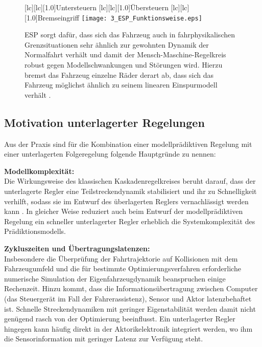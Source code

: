 %
\begin{figure}[h]
	[lc][lc][1.0]{Untersteuern}
	[lc][lc][1.0]{Übersteuern}
	[lc][lc][1.0]{Bremseingriff}
	\centering
  	\texttt{[image: 3\_ESP\_Funktionsweise.eps]}
  	\caption[Funktionsweise vom ESP]{ESP sorgt dafür, dass sich das Fahrzeug auch in fahrphysikalischen Grenzsituationen sehr ähnlich zur gewohnten Dynamik der Normalfahrt verhält und damit der Mensch-Maschine-Regelkreis robust gegen Modellschwankungen und Störungen wird. Hierzu bremst das Fahrzeug einzelne Räder derart ab, dass sich das Fahrzeug möglichst ähnlich zu seinem linearen Einspurmodell verhält \cite{BHB2012_vanZanten_bremsanlage}.}
    \label{fig:ESP_Funktionsweise}
\end{figure} 


\subsection{Motivation unterlagerter Regelungen}
Aus der Praxis sind für die Kombination einer modellprädiktiven Regelung mit einer unterlagerten Folgeregelung folgende Hauptgründe zu nennen:

\textbf{Modellkomplexität:} \\
Die Wirkungsweise des klassischen Kaskadenregelkreises beruht darauf, dass der unterlagerte Regler eine Teilstreckendynamik stabilisiert und ihr zu Schnelligkeit verhilft, sodass sie im Entwurf des überlagerten Reglers vernachlässigt werden kann \cite{graf2003neue}. In gleicher Weise reduziert auch beim Entwurf der modellprädiktiven Regelung ein schneller unterlagerter Regler erheblich die Systemkomplexität des Prädiktionsmodells.

\textbf{Zykluszeiten und Übertragungslatenzen:} \\
Insbesondere die Überprüfung der Fahrtrajektorie auf Kollisionen mit dem Fahrzeugumfeld und die für bestimmte Optimierungsverfahren erforderliche numerische Simulation der Eigenfahrzeugdynamik beanspruchen einige Rechenzeit. %
Hinzu kommt, dass die Informationsübertragung zwischen Computer (das Steuergerät im Fall der Fahrerassistenz), Sensor und Aktor latenzbehaftet ist. Schnelle Streckendynamiken mit geringer Eigenstabilität werden damit nicht genügend rasch von der Optimierung beeinflusst. Ein unterlagerter Regler hingegen kann häufig direkt in der Aktorikelektronik integriert werden, wo ihm die Sensorinformation mit geringer Latenz zur Verfügung steht.

